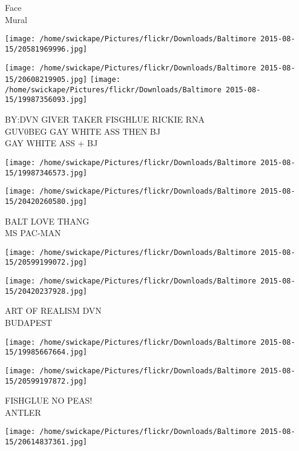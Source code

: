 \documentclass[10pt,letterpaper]{article}
\begin{document}
Face\\
Mural\\
\pagebreak

\texttt{[image: /home/swickape/Pictures/flickr/Downloads/Baltimore 2015-08-15/20581969996.jpg]}

\vspace{0.25in}
\texttt{[image: /home/swickape/Pictures/flickr/Downloads/Baltimore 2015-08-15/20608219905.jpg]}
\texttt{[image: /home/swickape/Pictures/flickr/Downloads/Baltimore 2015-08-15/19987356093.jpg]}

BY:DVN GIVER TAKER FISGHLUE RICKIE RNA\\
GUV0BEG GAY WHITE ASS THEN BJ\\
GAY WHITE ASS + BJ\\
\pagebreak

\texttt{[image: /home/swickape/Pictures/flickr/Downloads/Baltimore 2015-08-15/19987346573.jpg]}

\vspace{0.25in}
\texttt{[image: /home/swickape/Pictures/flickr/Downloads/Baltimore 2015-08-15/20420260580.jpg]}

BALT LOVE THANG\\
MS PAC{-}MAN\\
\pagebreak

\texttt{[image: /home/swickape/Pictures/flickr/Downloads/Baltimore 2015-08-15/20599199072.jpg]}

\vspace{0.25in}
\texttt{[image: /home/swickape/Pictures/flickr/Downloads/Baltimore 2015-08-15/20420237928.jpg]}

ART OF REALISM DVN\\
BUDAPEST\\
\pagebreak

\texttt{[image: /home/swickape/Pictures/flickr/Downloads/Baltimore 2015-08-15/19985667664.jpg]}

\vspace{0.25in}
\texttt{[image: /home/swickape/Pictures/flickr/Downloads/Baltimore 2015-08-15/20599197872.jpg]}

FISHGLUE NO PEAS!\\
ANTLER\\
\pagebreak

\texttt{[image: /home/swickape/Pictures/flickr/Downloads/Baltimore 2015-08-15/20614837361.jpg]}
\end{document}
